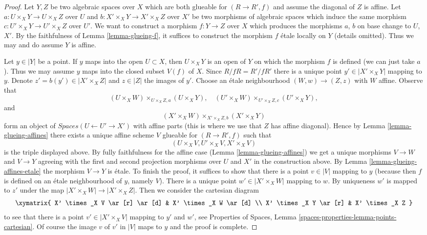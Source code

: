 \begin{proof}
Let $Y, Z$ be two algebraic spaces over $X$ which are both glueable for
$(R \to R', f)$ and assume the diagonal of $Z$ is affine. Let
$a : U \times_X Y \to U \times_X Z$ over $U$ and
$b : X' \times_X Y \to X' \times_X Z$ over $X'$ be two morphisms
of algebraic spaces
which induce the same morphism $c : U' \times_X Y \to U' \times_X Z$
over $U'$.
We want to construct a morphism $f : Y \to Z$ over $X$
which produces the morphisms $a$, $b$ on base change to $U$, $X'$.
By the faithfulness of Lemma \ref{lemma-glueing-f}, it suffices to construct
the morphism $f$ \'etale locally on $Y$ (details omitted).
Thus we may and do assume $Y$ is affine.

\medskip\noindent
Let $y \in |Y|$ be a point. If $y$ maps into the open $U \subset X$,
then $U \times_X Y$ is an open of $Y$ on which the morphism $f$
is defined (we can just take $a$).
Thus we may assume $y$ maps into the closed subset
$V(f)$ of $X$. Since $R/fR = R'/fR'$ there is a unique point
$y' \in |X' \times_X Y|$ mapping to $y$. Denote
$z' = b(y') \in |X' \times_X Z|$ and $z \in |Z|$ the images of $y'$.
Choose an \'etale neighbourhood $(W, w) \to (Z, z)$
with $W$ affine. Observe that
$$
(U \times_X W) \times_{U \times_X Z, a} (U \times_X Y),\quad
(U' \times_X W) \times_{U' \times_X Z, c} (U' \times_X Y),
$$
and
$$
(X' \times_X W) \times_{X' \times_X Z, b} (X' \times_X Y)
$$
form an object of $\textit{Spaces}(U \leftarrow U' \to X')$
with affine parts (this is where we use that $Z$ has affine diagonal).
Hence by Lemma \ref{lemma-glueing-affines}
there exists a unique affine scheme $V$ glueable for $(R \to R', f)$ such that
$$
(U \times_X V, U' \times_X V, X' \times_X V)
$$
is the triple displayed above. By fully faithfulness for the affine
case (Lemma \ref{lemma-glueing-affines}) we get a unique morphisms
$V \to W$ and $V \to Y$ agreeing with the first and second projection
morphisms over $U$ and $X'$ in the construction above.
By Lemma \ref{lemma-glueing-affines-etale} the morphism $V \to Y$ is \'etale.
To finish the proof, it suffices to show that there is a point $v \in |V|$
mapping to $y$ (because then $f$ is defined on an \'etale neighbourhood
of $y$, namely $V$).
There is a unique point $w' \in |X' \times_X W|$ mapping to $w$.
By uniqueness $w'$ is mapped to $z'$ under the map
$|X' \times_X W| \to |X' \times_X Z|$. Then we consider the cartesian
diagram
$$
\xymatrix{
X' \times_X V \ar[r] \ar[d] & X' \times_X W \ar[d] \\
X' \times_X Y \ar[r] & X' \times_X Z
}
$$
to see that there is a point $v' \in |X' \times_X V|$
mapping to $y'$ and $w'$, see
Properties of Spaces, Lemma \ref{spaces-properties-lemma-points-cartesian}.
Of course the image $v$ of $v'$ in $|V|$ maps to $y$ and the proof is complete.
\end{proof}

